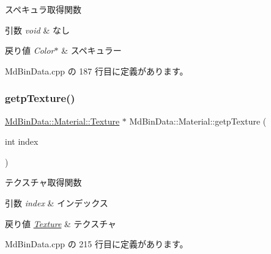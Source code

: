スペキュラ取得関数 


\begin{DoxyParams}{引数}
{\em void} & なし \\
\hline
\end{DoxyParams}

\begin{DoxyRetVals}{戻り値}
{\em Color$\ast$} & スペキュラー \\
\hline
\end{DoxyRetVals}


 Md\+Bin\+Data.\+cpp の 187 行目に定義があります。

\mbox{\label{class_md_bin_data_1_1_material_a51888aa2e18d1d191818cad0ee07f45d}} 
\subsubsection{\texorpdfstring{getp\+Texture()}{getpTexture()}}
{\footnotesize\ttfamily \mbox{\hyperlink{class_md_bin_data_1_1_material_1_1_texture}{Md\+Bin\+Data\+::\+Material\+::\+Texture}} $\ast$ Md\+Bin\+Data\+::\+Material\+::getp\+Texture (\begin{DoxyParamCaption}\item[{int}]{index }\end{DoxyParamCaption})}



テクスチャ取得関数 


\begin{DoxyParams}{引数}
{\em index} & インデックス \\
\hline
\end{DoxyParams}

\begin{DoxyRetVals}{戻り値}
{\em \mbox{\hyperlink{class_md_bin_data_1_1_material_1_1_texture}{Texture}}} & テクスチャ \\
\hline
\end{DoxyRetVals}


 Md\+Bin\+Data.\+cpp の 215 行目に定義があります。

\mbox{\label{class_md_bin_data_1_1_material_a93eee0080dcebaa2f75fdfd6fc353ce0}} 
